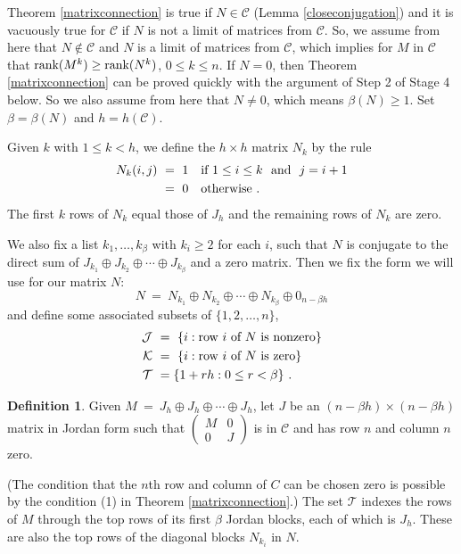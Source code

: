 \documentclass{amsart}
\theoremstyle{definition}
\newtheorem{definition}[theorem]{Definition}
\theoremstyle{remark}
\numberwithin{equation}{section}
\begin{document}
{{Theorem \ref{matrixconnection} is true if $N\in \mathcal C$ 
(Lemma \ref{closeconjugation}) and it is vacuously true 
for $\mathcal C$  if $N$ is not 
a limit of matrices from $\mathcal C$. So, we assume from here 
 that $N\notin \mathcal C$ and 
$N$ is a limit of matrices from $\mathcal C$, which implies 
for $M$ in $\mathcal C$ that 
$\textnormal{rank}(M^k)\geq \textnormal{rank}(N^k)$, $0\leq k\leq n$. 
If $N=0$, then Theorem \ref{matrixconnection} can be proved 
quickly with the argument of Step 2 of Stage 4 below. So 
we also assume from here that $N\neq 0$, which means $\beta (N)\geq 1$. 
Set $\beta =\beta (N)$ and $h=   h(\mathcal C) $. 

Given $k$ with $1\leq k <h$, we define 
the $h\times h$ matrix $N_k$ by the rule 
\begin{align*} 
N_k(i,j) \ &= \ 1 \quad \textnormal{if } 1\leq i \leq k \ \textnormal{ and } \ j=i+1 \\ 
&= \ 0 \quad \textnormal{otherwise } . 
\end{align*} 
The first $k$ rows of $N_k$ equal those of $J_h$ and the remaining rows 
of $N_k$ are zero. 

We also fix a list 
$k_1, \dots , k_{\beta}$ with $k_i\geq 2$ for each $i$, such that 
$N$ is conjugate to the direct sum of 
$J_{k_1} \oplus J_{k_2} \oplus \cdots \oplus J_{k_{\beta}}$ and a 
zero matrix. Then we fix the form we will use for our matrix $N$:  
\[
N \ = \ N_{k_1} \oplus N_{k_2} \oplus \cdots \oplus N_{k_{\beta}} \oplus 0_{n-\beta h}  
\]
and define some associated subsets of $\{1,2, \dots , n\}$,  
\begin{align*} 
\mathcal J \ &=\ \{i: \textnormal{row } i \textnormal{ of } N  \textnormal{ is nonzero} \}\\  
\mathcal K \ &=\ \{i: \textnormal{row } i \textnormal{ of } N  \textnormal{ is zero}\} \\ 
\mathcal T\ &=\{1+rh: 0\leq r < \beta\} \ . 
\end{align*} 

\begin{definition}\label{Jdefinition} Given 
$M \ = \ J_h \oplus J_h \oplus \cdots \oplus J_h$,  
let $J$ be an $(n-\beta h) \times (n-\beta h )$ matrix in Jordan form 
such that 
$
\left(
\begin{smallmatrix} M & 0 \\ 0 & J 
\end{smallmatrix}
\right)
$
is in $\mathcal C$ and has row $n$ and 
column $n$ zero. 
\end{definition} 
(The condition that the $n$th row and column of $C$ can 
be chosen zero is possible by the condition 
  (1) in Theorem \ref{matrixconnection}.) 
The set $\mathcal T$ indexes the rows of $M$ 
 through the 
top rows of its first $\beta $ Jordan blocks, each of which 
is  $J_h$. These are also 
the top rows of the diagonal blocks $N_{k_i}$ in $N$. 

}}
\end{document}
